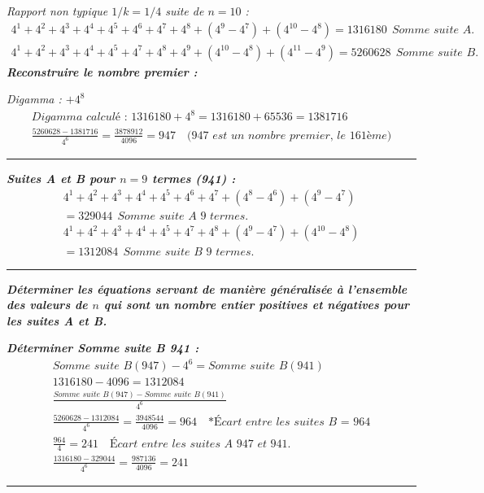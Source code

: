 \documentclass[11pt,a4paper]{article}
\begin{document}
\noindent\textit{Rapport non typique $1/k=1/4$ suite de $n=10$ :}
\begin{gather*}
4^{1}+4^{2}+4^{3}+4^{4}+4^{5}+4^{6}+4^{7}+4^{8}+(4^{9}-4^{7})+(4^{10}-4^{8})=1316180\ \ \textit{Somme suite A.}\\
4^{1}+4^{2}+4^{3}+4^{4}+4^{5}+4^{7}+4^{8}+4^{9}+(4^{10}-4^{8})+(4^{11}-4^{9})=5260628\ \ \textit{Somme suite B.}
\end{gather*}
\noindent\textbf{\textit{Reconstruire le nombre premier :}}

\noindent\textit{Digamma : $+4^{8}$}
\begin{gather*}
\textit{Digamma calculé : }1316180+4^{8}=1316180+65536=1381716\\
\frac{5260628-1381716}{4^{6}}=\frac{3878912}{4096}=947\quad\textit{(947 est un nombre premier, le 161ème)}
\end{gather*}
\noindent\rule{\linewidth}{0.4pt}

\noindent\textbf{\textit{Suites A et B pour $n=9$ termes (941) :}}
\begin{gather*}
4^{1}+4^{2}+4^{3}+4^{4}+4^{5}+4^{6}+4^{7}+(4^{8}-4^{6})+(4^{9}-4^{7})\\
=329044\ \ \textit{Somme suite A 9 termes.}\\
4^{1}+4^{2}+4^{3}+4^{4}+4^{5}+4^{7}+4^{8}+(4^{9}-4^{7})+(4^{10}-4^{8})\\
=1312084\ \ \textit{Somme suite B 9 termes.}
\end{gather*}
\noindent\rule{\linewidth}{0.4pt}

\noindent\textbf{\textit{Déterminer les équations servant de manière généralisée à l’ensemble des valeurs de $n$ qui sont un nombre entier positives et négatives pour les suites A et B.}}

\noindent\textbf{\textit{Déterminer Somme suite B 941 :}}
\begin{gather*}
\textit{Somme suite B}(947)-4^{6}=\textit{Somme suite B}(941)\\
1316180-4096=1312084\\
\frac{\textit{Somme suite B}(947)-\textit{Somme suite B}(941)}{4^{6}}\\
\frac{5260628-1312084}{4^{6}}=\frac{3948544}{4096}=964\quad\textit{*Écart entre les suites B = 964}\\
\frac{964}{4}=241\quad\textit{Écart entre les suites A 947 et 941.}\\
\frac{1316180-329044}{4^{6}}=\frac{987136}{4096}=241
\end{gather*}
\noindent\rule{\linewidth}{0.4pt}
\end{document}
